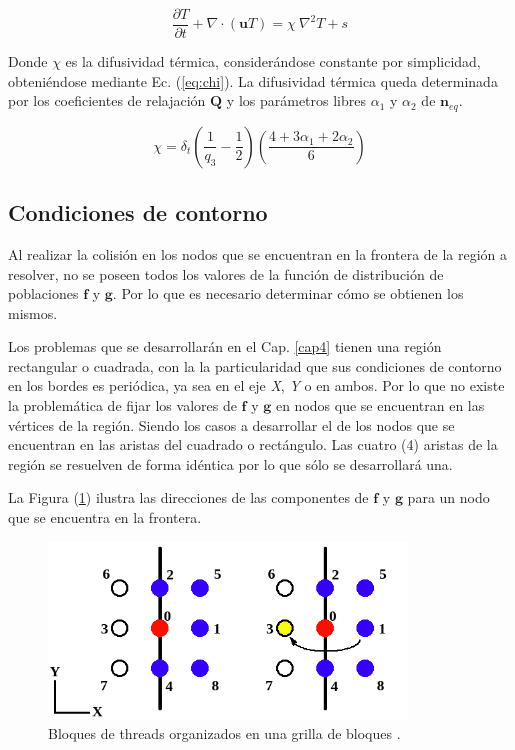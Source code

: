 \begin{equation}
    \frac{\partial T}{\partial t} + \nabla \cdot ( \mathbf{u} T ) = \chi \> {\nabla }^{2} T + s
\end{equation}

Donde $\chi$ es la difusividad térmica, considerándose constante por simplicidad, obteniéndose mediante Ec. (\ref{eq:chi}). La difusividad térmica queda determinada por los coeficientes de relajación $\mathbf{Q}$ y los parámetros libres $\alpha_{1}$ y $\alpha_{2}$ de ${\textbf{n}}_{eq}$.

\begin{equation}
    \chi = \delta_{t} \left( \frac{1}{q_{3}} - \frac{1}{2} \right) \left( \frac{ 4 + 3 \alpha_{1} + 2 \alpha_{2}}{6} \right)
    \label{eq:chi}
\end{equation}

\subsection{Condiciones de contorno}

Al realizar la colisión en los nodos que se encuentran en la frontera de la región a resolver, no se poseen todos los valores de la función de distribución de poblaciones $\mathbf{f}$ y $\mathbf{g}$. Por lo que es necesario determinar cómo se obtienen los mismos. 

Los problemas que se desarrollarán en el Cap. \ref{cap4} tienen una región rectangular o cuadrada, con la la particularidad que sus  condiciones de contorno en los bordes es periódica, ya sea en el eje \textit{X}, \textit{Y} o en ambos. Por lo que no existe la problemática de fijar los valores de $\mathbf{f}$ y $\mathbf{g}$ en nodos que se encuentran en las vértices de la región. Siendo los casos a desarrollar  el de los nodos que se encuentran en las aristas del cuadrado o rectángulo. Las cuatro (4) aristas de la región se resuelven de forma idéntica por lo que sólo se  desarrollará una.

La Figura (\ref{fig:CC_hidro}) ilustra las direcciones de las componentes de $\mathbf{f}$ y $\mathbf{g}$ para un nodo que se encuentra en la frontera.    

\begin{figure}[h!]
	\centering
	\includegraphics[width=0.85\textwidth]{figs/cap2/CC_hidrodinamica.png}
	\caption{Bloques de threads organizados en una grilla de bloques \cite{rinaldi2011modelos}.}
	\label{fig:CC_hidro}
\end{figure}

